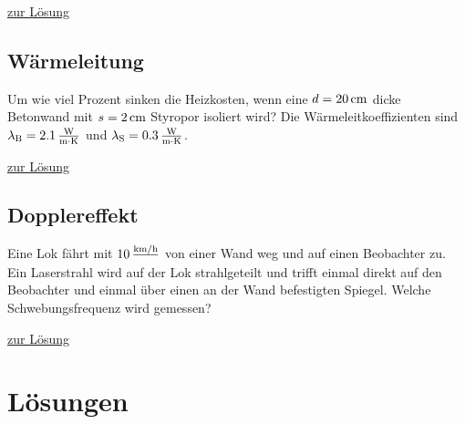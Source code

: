 \documentclass[a4paper]{scrartcl}
\begin{document}
\hyperref[lsg:Waermekap]{zur Lösung}

\subsection{Wärmeleitung}
\label{aufg:Waermeleitung}
Um wie viel Prozent sinken die Heizkosten, wenn eine $d = \unit[20]{cm}$ dicke Betonwand mit $s = \unit[2]{cm}$ Styropor isoliert wird? Die Wärmeleitkoeffizienten sind $\lambda_\text{B} = \unit[2.1]{\frac{W}{m\cdot K}}$ und $\lambda_\text{S} = \unit[0.3]{\frac{W}{m\cdot K}}$.


\hyperref[lsg:Waermeleitung]{zur Lösung}

\subsection{Dopplereffekt}
\label{aufg:Doppler}
Eine Lok fährt mit $\unit[10]{\frac{km/h}}$ von einer Wand weg und auf einen Beobachter zu. Ein Laserstrahl wird auf der Lok strahlgeteilt und trifft einmal direkt auf den Beobachter und einmal über einen an der Wand befestigten Spiegel. Welche Schwebungsfrequenz wird gemessen?

\hyperref[lsg:Doppler]{zur Lösung}

\pagebreak
\section{Lösungen}
\end{document}
